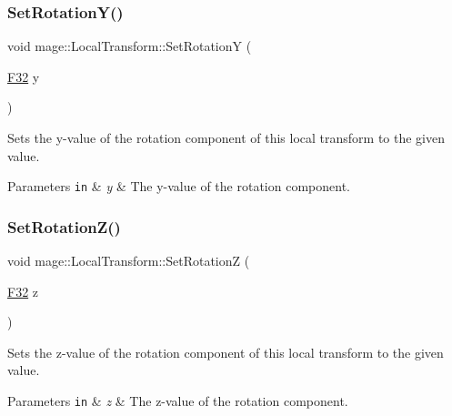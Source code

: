 \subsubsection{\texorpdfstring{Set\+Rotation\+Y()}{SetRotationY()}}
{\footnotesize\ttfamily void mage\+::\+Local\+Transform\+::\+Set\+RotationY (\begin{DoxyParamCaption}\item[{\mbox{\hyperlink{namespacemage_aa97e833b45f06d60a0a9c4fc22ae02c0}{F32}}}]{y }\end{DoxyParamCaption})\hspace{0.3cm}{\ttfamily [noexcept]}}

Sets the y-\/value of the rotation component of this local transform to the given value.


\begin{DoxyParams}[1]{Parameters}
\mbox{\tt in}  & {\em y} & The y-\/value of the rotation component. \\
\hline
\end{DoxyParams}
\mbox{\label{classmage_1_1_local_transform_a1dcec183b2f7ebf3fc7eb4ab574ca045}} 
\subsubsection{\texorpdfstring{Set\+Rotation\+Z()}{SetRotationZ()}}
{\footnotesize\ttfamily void mage\+::\+Local\+Transform\+::\+Set\+RotationZ (\begin{DoxyParamCaption}\item[{\mbox{\hyperlink{namespacemage_aa97e833b45f06d60a0a9c4fc22ae02c0}{F32}}}]{z }\end{DoxyParamCaption})\hspace{0.3cm}{\ttfamily [noexcept]}}

Sets the z-\/value of the rotation component of this local transform to the given value.


\begin{DoxyParams}[1]{Parameters}
\mbox{\tt in}  & {\em z} & The z-\/value of the rotation component. \\
\hline
\end{DoxyParams}
\mbox{\label{classmage_1_1_local_transform_ae5940b8381188b25b164322d0c848fb3}} 
